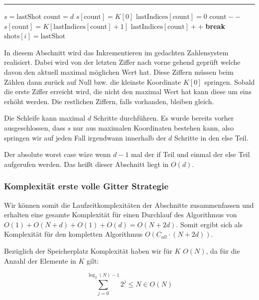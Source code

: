 \documentclass[a4paper,12pt]{llncs}
\numberwithin{equation}{section}
\begin{document}
\smallskip
\hrule
\smallskip

\begin{tcolorbox}
	\begin{algorithmic}
		\State $s=\text{lastShot}$
		\State $\text{count} =d$
		\State $s[\text{count}]=K[0]$
		\State $\text{lastIndices}[\text{count}]=0$
		\State $\text{count}--$
		\Else
		\State $s[\text{count}] = K[\text{lastIndices}[\text{count}]+1]$
		\State $\text{lastIndices}[\text{count}]++$
		\State\textbf{break}
		\State $\text{shots}[i] = \text{lastShot}$
		\EndIf
		\EndWhile
		\EndFunction
	\end{algorithmic}
\end{tcolorbox}

In diesem Abschnitt wird das Inkrementieren im gedachten Zahlensystem realisiert. Dabei wird von der letzten Ziffer nach vorne gehend geprüft welche davon den aktuell maximal möglichen Wert hat. Diese Ziffern müssen beim Zählen dann zurück auf Null bzw. die kleinste Koordinate $K[0]$ springen. Sobald die erste Ziffer erreicht wird, die nicht den maximal Wert hat kann diese um eins erhöht werden. Die restlichen Ziffern, falls vorhanden, bleiben gleich. 

Die Schleife kann maximal $d$ Schritte durchführen. Es wurde bereits vorher ausgeschlossen, dass $s$ nur aus maximalen Koordinaten bestehen kann, also springen wir auf jeden Fall irgendwann innerhalb der $d$ Schritte in den else Teil. 

Der absolute worst case wäre wenn $d-1$ mal der if Teil und einmal der else Teil aufgerufen werden. Das heißt dieser Abschnitt liegt in $O(d)$.

\subsubsection{Komplexität erste volle Gitter Strategie}

Wir können somit die Laufzeitkomplexitäten der Abschnitte zusammenfassen und erhalten eine gesamte Komplexität für einen Durchlauf des Algorithmus von $O(1)+O(N+d)+O(1)+O(d)=O(N+2d)$. Somit ergibt sich als Komplexität für den kompletten Algorithmus $O(C_{all}\cdot (N+2d))$.


Bezüglich der Speicherplatz Komplexität haben wir für $K$ $O(N)$, da für die Anzahl der Elemente in $K$ gilt:

\begin{equation}
\sum_{j=0}^{\log_2(N)-1}2^j\leq N \in O\left(N\right)
\end{equation}
\end{document}
